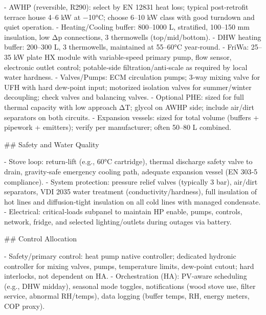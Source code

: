 \documentclass[11pt,oneside]{report}
\begin{document}
\begin{markdown}
- AWHP (reversible, R290): select by EN 12831 heat loss; typical post‑retrofit terrace house 4–6 kW at −10°C; choose 6–10 kW class with good turndown and quiet operation.
- Heating/Cooling buffer: 800–1000 L, stratified, 100–150 mm insulation, low Δp connections, 3 thermowells (top/mid/bottom).
- DHW heating buffer: 200–300 L, 3 thermowells, maintained at 55–60°C year‑round.
- FriWa: 25–35 kW plate HX module with variable‑speed primary pump, flow sensor, electronic outlet control; potable‑side filtration/anti‑scale as required by local water hardness.
- Valves/Pumps: ECM circulation pumps; 3‑way mixing valve for UFH with hard dew‑point input; motorized isolation valves for summer/winter decoupling; check valves and balancing valves.
- Optional PHE: sized for full thermal capacity with low approach ΔT; glycol on AWHP side; include air/dirt separators on both circuits.
- Expansion vessels: sized for total volume (buffers + pipework + emitters); verify per manufacturer; often 50–80 L combined.

## Safety and Water Quality

- Stove loop: return‑lift (e.g., 60°C cartridge), thermal discharge safety valve to drain, gravity‑safe emergency cooling path, adequate expansion vessel (EN 303‑5 compliance).
- System protection: pressure relief valves (typically 3 bar), air/dirt separators, VDI 2035 water treatment (conductivity/hardness), full insulation of hot lines and diffusion‑tight insulation on all cold lines with managed condensate.
- Electrical: critical‑loads subpanel to maintain HP enable, pumps, controls, network, fridge, and selected lighting/outlets during outages via battery.

## Control Allocation

- Safety/primary control: heat pump native controller; dedicated hydronic controller for mixing valves, pumps, temperature limits, dew‑point cutout; hard interlocks, not dependent on HA.
- Orchestration (HA): PV‑aware scheduling (e.g., DHW midday), seasonal mode toggles, notifications (wood stove use, filter service, abnormal RH/temps), data logging (buffer temps, RH, energy meters, COP proxy).
\end{markdown}
\end{document}
